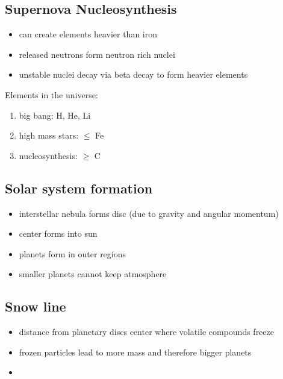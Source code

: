 \documentclass{article}
\theoremstyle{sltheorem}
\begin{document}
\subsection{Supernova Nucleosynthesis}
\begin{itemize}
    \item can create elements heavier than iron
    \item released neutrons form neutron rich nuclei
    \item unstable nuclei decay via beta decay to form heavier elements
\end{itemize}
Elements in the universe:
\begin{enumerate}
    \item big bang: H, He, Li
    \item high mass stars: $\leq$ Fe
    \item nucleosynthesis: $\geq$ C
\end{enumerate}
\subsection{Solar system formation}
\begin{itemize}
    \item interstellar nebula forms disc (due to gravity and angular momentum)
    \item center forms into sun
    \item planets form in outer regions
    \item smaller planets cannot keep atmosphere
\end{itemize}
\subsection{Snow line}
\begin{itemize}
    \item distance from planetary discs center where volatile compounds freeze
    \item frozen particles lead to more mass and therefore bigger planets
    \item {}
\end{itemize}
\end{document}
